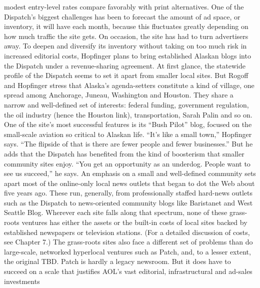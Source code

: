 modest entry-level rates compare favorably with print alternatives.
One of the Dispatch's biggest challenges has been to forecast the amount of
ad space, or inventory, it will have each month, because this fluctuates greatly
depending on how much traffic the site gets. On occasion, the site has had to
turn advertisers away. To deepen and diversify its inventory without taking on
too much risk in increased editorial costs, Hopfinger plans to bring established
Alaskan blogs into the Dispatch under a revenue-sharing agreement.
At first glance, the statewide profile of the Dispatch seems to set it apart from
smaller local sites. But Rogoff and Hopfinger stress that Alaska's agenda-setters
constitute a kind of village, one spread among Anchorage, Juneau, Washington
and Houston. They share a narrow and well-defined set of interests: federal funding,
government regulation, the oil industry (hence the Houston link), transportation,
Sarah Palin and so on. One of the site's most successful features is its ``Bush
Pilot'' blog, focused on the small-scale aviation so critical to Alaskan life.
``It's like a small town,'' Hopfinger says. ``The flipside of that is there are fewer
people and fewer businesses.'' But he adds that the Dispatch has benefited from
the kind of boosterism that smaller community sites enjoy. ``You get an opportunity
as an underdog. People want to see us succeed,'' he says.
An emphasis on a small and well-defined community sets apart most of the
online-only local news outlets that began to dot the Web about five years ago.
These run, generally, from professionally staffed hard-news outlets such as the
Dispatch to news-oriented community blogs like Baristanet and West Seattle
Blog. Wherever each site falls along that spectrum, none of these grass-roots
ventures has either the assets or the built-in costs of local sites backed by established
newspapers or television stations. (For a detailed discussion of costs,
see Chapter 7.)
The grass-roots sites also face a different set of problems than do large-scale,
networked hyperlocal ventures such as Patch, and, to a lesser extent, the original
TBD. Patch is hardly a legacy newsroom. But it does have to succeed on a
scale that justifies AOL's vast editorial, infrastructural and ad-sales investments


